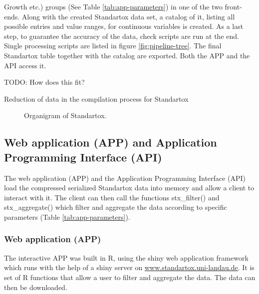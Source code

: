Growth etc.) groups (See Table \ref{tab:app-parameters}) in one of the two front-ends. Along with the created Standartox data set, a catalog of it, listing all possible entries and value ranges, for continuous variables is created. As a last step, to guarantee the accuracy of the data, check scripts are run at the end. Single processing scripts are listed in figure \ref{fig:pipeline-tree}. The final Standartox table together with the catalog are exported. Both the APP and the API access it.

TODO: How does this fit?
\begin{table}
    
    \caption{Reduction of data in the compilation process for Standartox}
    \label{tab:data-refinement}
\end{table}

\begin{figure}
    
    \caption{Organigram of Standartox.}
    \label{fig:stx-organigram}
\end{figure}




\subsection*{Web application (APP) and Application Programming Interface (API)}
The web application (APP) and the Application Programming Interface (API) load the compressed serialized Standartox data into memory and allow a client to interact with it. The client can then call the functions stx\_filter() and stx\_aggregate() which filter and aggregate the data according to specific parameters (Table \ref{tab:app-parameters}).






\subsubsection*{Web application (APP)}
The interactive APP was built in R, using the shiny web application framework which runs with the help of a shiny server \citep{chang_shiny_2018} on \url{www.standartox.uni-landau.de}. It is set of R functions that allow a user to filter and aggregate the data. The data can then be downloaded.

